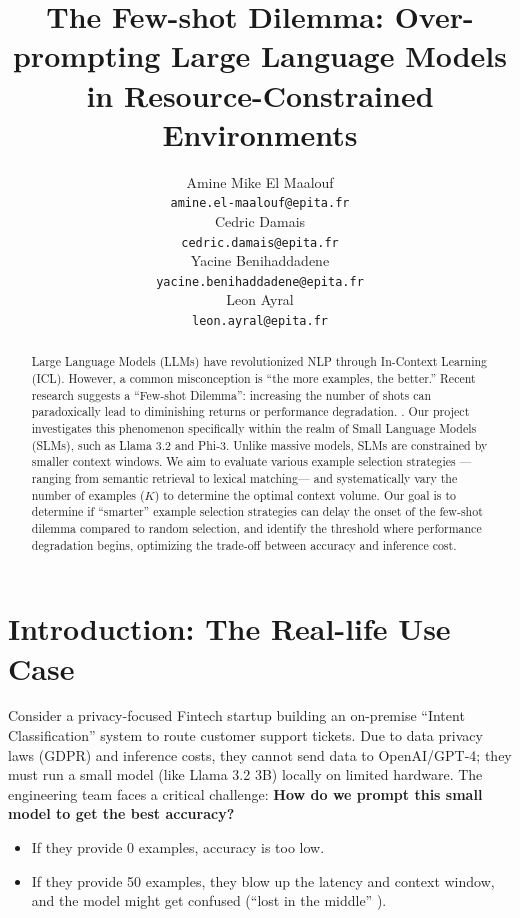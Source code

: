 \documentclass{article}
\title{The Few-shot Dilemma: Over-prompting Large Language Models in Resource-Constrained Environments}
\author{%
  Amine Mike El Maalouf \\
  \texttt{amine.el-maalouf@epita.fr} \\
  \And
  Cedric Damais \\
  \texttt{cedric.damais@epita.fr} \\
  \And
  Yacine Benihaddadene \\
  \texttt{yacine.benihaddadene@epita.fr} \\
  \And
  Leon Ayral \\
  \texttt{leon.ayral@epita.fr} \\
}
\begin{document}
\maketitle


\begin{abstract}
Large Language Models (LLMs) have revolutionized NLP through In-Context Learning (ICL). However, a common misconception is ``the more examples, the better.'' Recent research suggests a ``Few-shot Dilemma'': increasing the number of shots can paradoxically lead to diminishing returns or performance degradation. \citep{fewshot2025}. Our project investigates this phenomenon specifically within the realm of Small Language Models (SLMs), such as Llama 3.2 and Phi-3. Unlike massive models, SLMs are constrained by smaller context windows. We aim to evaluate various example selection strategies ---ranging from semantic retrieval to lexical matching--- and systematically vary the number of examples ($K$) to determine the optimal context volume. Our goal is to determine if ``smarter'' example selection strategies can delay the onset of the few-shot dilemma compared to random selection, and identify the threshold where performance degradation begins, optimizing the trade-off between accuracy and inference cost.
\end{abstract}



\section{Introduction: The Real-life Use Case}
Consider a privacy-focused Fintech startup building an on-premise ``Intent Classification'' system to route customer support tickets. Due to data privacy laws (GDPR) and inference costs, they cannot send data to OpenAI/GPT-4; they must run a small model (like Llama 3.2 3B) locally on limited hardware. The engineering team faces a critical challenge: \textbf{How do we prompt this small model to get the best accuracy?}

\begin{itemize}
    \item If they provide 0 examples, accuracy is too low.
    \item If they provide 50 examples, they blow up the latency and context window, and the model might get confused (``lost in the middle'' \citep{lostInTheMiddle2023}).
\end{itemize}
\end{document}
